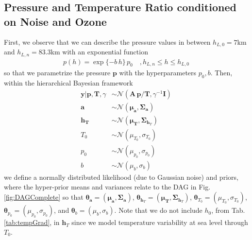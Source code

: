 \subsection{Pressure and Temperature Ratio conditioned on Noise and Ozone}
\label{subsec:PressTempSetup}
First, we observe that we can describe the pressure values in between $h_{L,0}=7$km and $h_{L,n} = 83.3$km with an exponential function
\begin{align}
	p(h) =
	\exp{ \{ -b \, h  \} } \,  p_0 \quad ,h_{L,n}  \leq h \leq h_{L,0}
	\label{eq:pressFunc}
\end{align}
so that we parametrize the pressure $\bm{p}$ with the hyperparameters $p_0,b$.
Then, within the hierarchical Bayesian framework
\begin{subequations}
	\begin{align}
		\bm{y} |  \bm{p}, \bm{T}, \gamma &\sim \mathcal{N}(\bm{A} \, \bm{p}/\bm{T}, \gamma^{-1} \bm{I}) \label{eq:likelihoodPT} \\
		\bm{a}  &\sim \mathcal{N}(\bm{\mu}_{\bm{a}}, \bm{\Sigma}_{\bm{a}})\\
		\bm{h}_{\bm{T}}  &\sim \mathcal{N}(\bm{\mu}_{\bm{T}}, \bm{\Sigma}_{\bm{h}_T}) \\
		T_0  &\sim \mathcal{N}(\mu_{T_0}, \sigma_{T_0} )\\
		p_0  &\sim \mathcal{N}(\mu_{p_0}, \sigma_{p_0} )\\
		b  &\sim \mathcal{N}(\mu_b, \sigma_b )
	\end{align}
	\label{eq:BayMode}
\end{subequations}
we define a normally distributed likelihood (due to Gaussian noise) and priors, where the hyper-prior means and variances relate to the DAG in Fig. \ref{fig:DAGComplete} so that $\bm{\theta}_{\bm{a}} =(\bm{\mu}_{\bm{a}}, \bm{\Sigma}_{\bm{a}})$, $\bm{\theta}_{\bm{h}_T} = (\bm{\mu}_{\bm{T}}, \bm{\Sigma}_{\bm{h}_T}) $, 
$\bm{\theta}_{T_0} = (\mu_{T_0}, \sigma_{T_0})$, $\bm{\theta}_{p_0} = (\mu_{p_0}, \sigma_{p_0})$, and $\bm{\theta}_{b} = (\mu_{b}, \sigma_{b})$.
Note that we do not include $h_0$, from Tab. \ref{tab:tempGrad}, in $\bm{h}_T$ since we model temperature variability at sea level through $T_0$.

